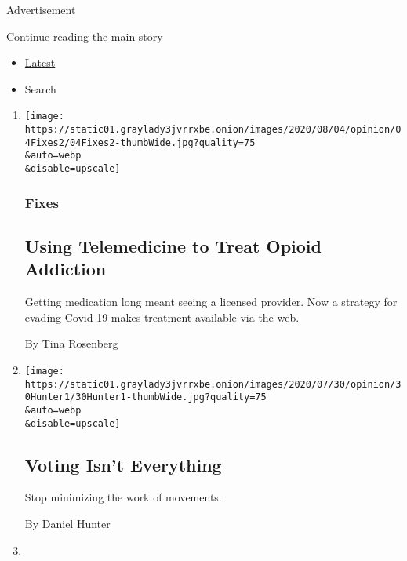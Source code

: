 Advertisement

\protect\hyperlink{after-mid1}{Continue reading the main story}

\begin{itemize}
\tightlist
\item
  \protect\hyperlink{stream-panel}{Latest}
\item
  Search
\end{itemize}

\begin{enumerate}
\def\labelenumi{\arabic{enumi}.}
\item
  \href{/2020/08/04/opinion/opioid-telemedicine-covid.html}{}

  \texttt{[image: https://static01.graylady3jvrrxbe.onion/images/2020/08/04/opinion/04Fixes2/04Fixes2-thumbWide.jpg?quality=75\\\&auto=webp\\\&disable=upscale]}

  \hypertarget{fixes}{%
  \subsubsection{Fixes}\label{fixes}}

  \hypertarget{using-telemedicine-to-treat-opioid-addiction}{%
  \subsection{Using Telemedicine to Treat Opioid
  Addiction}\label{using-telemedicine-to-treat-opioid-addiction}}

  Getting medication long meant seeing a licensed provider. Now a
  strategy for evading Covid-19 makes treatment available via the web.

  By Tina Rosenberg
\item
  \href{/2020/08/04/opinion/voting-2020-election-blm-movement.html}{}

  \texttt{[image: https://static01.graylady3jvrrxbe.onion/images/2020/07/30/opinion/30Hunter1/30Hunter1-thumbWide.jpg?quality=75\\\&auto=webp\\\&disable=upscale]}

  \hypertarget{voting-isnt-everything}{%
  \subsection{Voting Isn't Everything}\label{voting-isnt-everything}}

  Stop minimizing the work of movements.

  By Daniel Hunter
\item
  \href{/2020/08/03/opinion/spacex-stonehenge-mars.html}{}


\end{enumerate}
